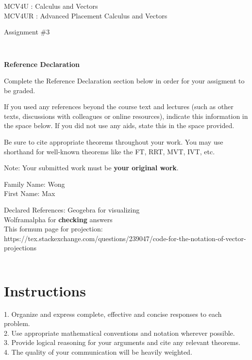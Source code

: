 \documentclass[12pt]{book}
\begin{document}
\vspace{-1.0in}\begin{center}
\Large{MCV4U : Calculus and Vectors}\\
\Large{MCV4UR : Advanced Placement Calculus and Vectors }

\Large{Assignment \#3}


\end{center}


\vspace{0.015in}\hrulefill\ 

\textbf{Reference Declaration} %

Complete the Reference Declaration section below in order for your assigment to be graded.

If you used any references beyond the course text and lectures (such as other texts, discussions with colleagues or online resources), indicate this information in the space below.  If you did not use any aids, state this in the space provided. 

Be sure to cite appropriate theorems throughout your work. You may use shorthand for well-known theorems like the FT, RRT, MVT, IVT, etc. 

Note: Your submitted work must be \textbf{your original work}. 

Family Name: Wong\\%
First Name: Max%

Declared References: 
Geogebra for visualizing\\
Wolframalpha for \textbf{checking} answers \\
This formum page for projection: https://tex.stackexchange.com/questions/239047/code-for-the-notation-of-vector-projections \\

\vspace{0.015in}\hrulefill\ 

\newpage

\section*{Instructions}

\begin{center}
\setlength{\fboxrule}{2pt}
\begin{boxedminipage}{6.5in}
1.	Organize and express complete, effective and concise responses to each problem.\\
2.	Use appropriate mathematical conventions and notation wherever possible.\\
3.	Provide logical reasoning for your arguments and cite any relevant theorems. \\
4.  The quality of your communication will be heavily weighted.
\end{boxedminipage}
\end{center} 
\end{document}
